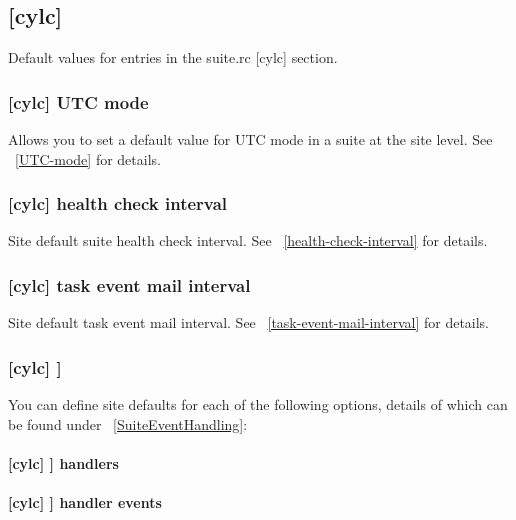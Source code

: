 \subsection{[cylc]}

Default values for entries in the suite.rc [cylc] section.

\subsubsection[UTC mode]{[cylc] \textrightarrow UTC mode}
\label{SiteUTCMode}

Allows you to set a default value for UTC mode in a suite at the site level.
See ~\ref{UTC-mode} for details.

\subsubsection[health check interval]{[cylc] \textrightarrow health check interval}

Site default suite health check interval.
See ~\ref{health-check-interval} for details.

\subsubsection[task event mail interval]{[cylc] \textrightarrow task event mail interval}

Site default task event mail interval.
See ~\ref{task-event-mail-interval} for details.

\subsubsection[{[}events{]}]{[cylc] \textrightarrow [[events]]}
\label{SiteCylcHooks}

You can define site defaults for each of the following options, details
of which can be found under ~\ref{SuiteEventHandling}:

\paragraph[handlers]{[cylc] \textrightarrow [[events]] \textrightarrow handlers}

\paragraph[handler events]{[cylc] \textrightarrow [[events]] \textrightarrow handler events}

